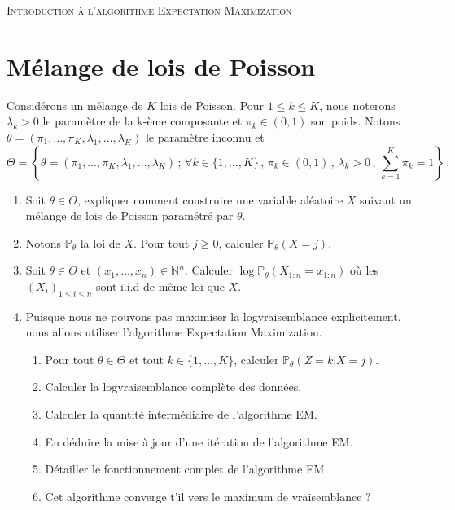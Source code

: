 \documentclass[a4paper,10pt,fleqn]{article}
\newcommand{\1}{\ensuremath{\mathbbm{1}}}
\begin{document}


\noindent\hrulefill

\begin{center}
\textsc{Introduction \`a l'algorithme Expectation Maximization}
\end{center}
\hrulefill

\section*{M\'elange de lois de Poisson}

Consid\'erons un m\'elange de $K$ lois de Poisson. Pour $1\leq k \leq K$, nous noterons $\lambda_k>0$ le param\`etre de la k-\`eme composante et $\pi_k\in(0,1)$ son poids. Notons $\theta = (\pi_1,\ldots,\pi_K,\lambda_1,\ldots,\lambda_K)$ le param\`etre inconnu et 
$$
\Theta = \left\{\theta = (\pi_1,\ldots,\pi_K,\lambda_1,\ldots,\lambda_K)\,;\, \forall k \in\{1,\ldots,K\}\,,\, \pi_k\in(0,1)\,,\,\lambda_k>0\,,\, \sum_{k=1}^K\pi_k = 1\right\}\,.
$$
\begin{enumerate}
\item Soit $\theta\in\Theta$, expliquer comment construire une variable al\'eatoire $X$ suivant un m\'elange de lois de Poisson param\'etr\'e par $\theta$.


\item Notons $\mathbb{P}_\theta$ la loi de $X$. Pour tout $j\geq 0$, calculer $\mathbb{P}_\theta(X=j)$.

\item Soit $\theta\in\Theta$ et $(x_1,\ldots,x_n)\in\mathbb{N}^n$. Calculer $\log \mathbb{P}_\theta(X_{1:n}=x_{1:n}) $ o\`u les $(X_i)_{1\leq i \leq n}$ sont i.i.d de m\^eme loi que $X$.

\item Puisque nous ne pouvons pas maximiser la logvraisemblance explicitement, nous allons utiliser l'algorithme Expectation Maximization.

\begin{enumerate}
\item Pour tout $\theta\in\Theta$ et tout $k\in\{1,\ldots,K\}$, calculer $\mathbb{P}_\theta(Z=k|X=j)$.
\item Calculer la logvraisemblance compl\`ete des donn\'ees.
\item  Calculer la quantit\'e interm\'ediaire de l'algorithme EM.
\item En d\'eduire la mise \`a jour d'une it\'eration de l'algorithme EM.

\item D\'etailler le fonctionnement complet de l'algorithme EM

\item Cet algorithme converge t'il vers le maximum de vraisemblance ?


\end{enumerate}
\end{enumerate}
\end{document}

